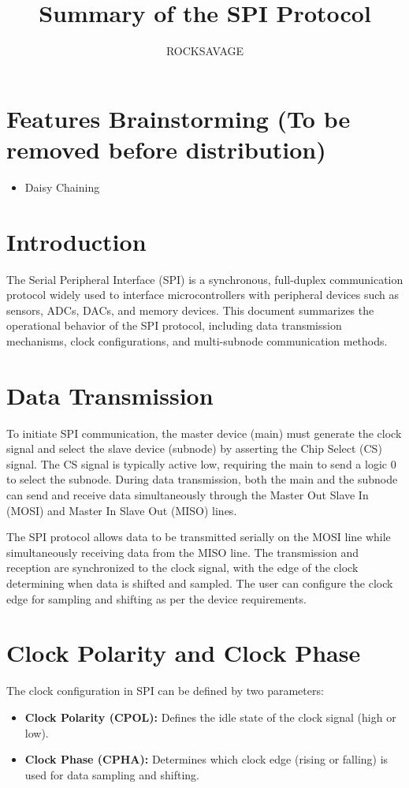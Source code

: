\documentclass{article}
\title{Summary of the SPI Protocol}
\author{ROCKSAVAGE}
\date{}
\begin{document}
\maketitle

\section{Features Brainstorming (To be removed before distribution)}
\begin{itemize}
    \item Daisy Chaining
\end{itemize}

\section{Introduction}
The Serial Peripheral Interface (SPI) is a synchronous, full-duplex communication protocol widely used to interface microcontrollers with peripheral devices such as sensors, ADCs, DACs, and memory devices. This document summarizes the operational behavior of the SPI protocol, including data transmission mechanisms, clock configurations, and multi-subnode communication methods.

\section{Data Transmission}
To initiate SPI communication, the master device (main) must generate the clock signal and select the slave device (subnode) by asserting the Chip Select (CS) signal. The CS signal is typically active low, requiring the main to send a logic 0 to select the subnode. During data transmission, both the main and the subnode can send and receive data simultaneously through the Master Out Slave In (MOSI) and Master In Slave Out (MISO) lines.

The SPI protocol allows data to be transmitted serially on the MOSI line while simultaneously receiving data from the MISO line. The transmission and reception are synchronized to the clock signal, with the edge of the clock determining when data is shifted and sampled. The user can configure the clock edge for sampling and shifting as per the device requirements.

\section{Clock Polarity and Clock Phase}
The clock configuration in SPI can be defined by two parameters:
\begin{itemize}
    \item \textbf{Clock Polarity (CPOL):} Defines the idle state of the clock signal (high or low).
    \item \textbf{Clock Phase (CPHA):} Determines which clock edge (rising or falling) is used for data sampling and shifting.
\end{itemize}
\end{document}
